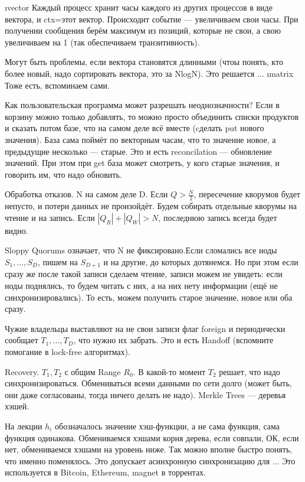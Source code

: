 \begin{enumarate}
\begin{enumerate}
\i vector
Каждый процесс хранит часы каждого из других процессов в виде вектора, и ctx=этот вектор. Происходит событие --- увеличиваем свои часы. При получении сообщения берём максимум из позиций, которые не свои, а свою увеличиваем на 1 (так обеспечиваем транзитивность).

Могут быть проблемы, если вектора становятся длинными (чтоы понять, кто более новый, надо сортировать вектора, это за NlogN). Это решается ...
\i matrix
Тоже есть, вспоминаем сами.
\end{enumerate}

Как пользовательская программа может разрешать неоднозначности?
Если в корзину можно только добавлять, то можно просто объединить списки продуктов и сказать потом базе, что на самом деле всё вместе (cделать put нового значения). 
База сама поймёт по векторным часам, что то значение новое, а предыдущие несколько --- старые.
Это и есть reconcilation --- обновление значений.
При этом при get база может смотреть, у кого старые значения, и говорить им, что надо обновить.

Обработка отказов.
N на самом деле D.
Если $Q>\frac{N}{2}$, пересечение кворумов будет непусто, и потери данных не произойдёт.
Будем собирать отдельные кворумы на чтение и на запись. Если $|Q_R| + |Q_W|>N$, последнюю запись всегда будет видно.

Sloppy Quorums означает, что N не фиксировано.Если сломались все ноды $S_1, \dots, S_D$, пишем на $S_{D+1}$ и на другие, до которых дотянемся. Но при этом если сразу же после такой записи сделаем чтение, записи можем не увидеть: если ноды поднялись, то будем читать с них, а на них нету информации (ещё не синхронизировались). То есть, можем получить старое значение, новое или оба сразу.

Чужие владельцы выставляют на не свои записи флаг foreign и периодически сообщает $T_1, \dots, T_D$, что нужно их забрать. Это и есть Handoff (вспомните помогание в lock-free алгоритмах).

Recovery.
$T_1, T_2$ с общим Range $R_0$. В какой-то момент $T_2$ решает, что надо синхронизироваться. Обмениваться всеми данными по сети долго (может быть, они даже согласованы, тогда ничего делать не надо).
Merkle Trees --- деревья хэшей. 

На лекции $h_i$ обозначалось значение хэш-функции, а не сама функция, сама функция одинакова. Обмениваемся хэшами корня дерева, если совпали, ОК, если нет, обмениваемся хэшами на уровень ниже. Так можно вполне быстро понять, что именно поменялось.
Это допускает асинхронную синхронизацию для ...
Это используется в Bitcoin, Ethereum, magnet в торрентах.


\end{enumarate}
